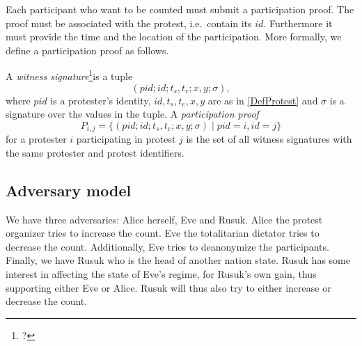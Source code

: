 Each participant who want to be counted must submit a participation proof.
The proof must be associated with the protest, i.e.\ contain its \(id\).
Furthermore it must provide the time and the location of the participation.
More formally, we define a participation proof as follows.

\begin{definition}
  A \emph{witness signature}\footnote{%
    ?
  }is a tuple \[(pid; id; t_s, t_e; x, y; \sigma),\] where
  \(pid\) is a protester's identity,
  \(id, t_s, t_e, x, y\) are as in \cref{DefProtest} and
  \(\sigma\) is a signature over the values in the tuple.
  A \emph{participation proof} \[P_{i, j} = \{ (pid; id; t_s, t_e; x, y; \sigma) 
    \mid pid = i, id = j\}\] for a protester \(i\) participating in protest 
  \(j\) is the set of all witness signatures with the same protester and protest 
  identifiers.
\end{definition}


\subsection{Adversary model}

We have three adversaries: Alice herself, Eve and Rusuk.
Alice the protest organizer tries to increase the count.
Eve the totalitarian dictator tries to decrease the count.
Additionally, Eve tries to deanonymize the participants.
Finally, we have Rusuk who is the head of another nation state.
Rusuk has some interest in affecting the state of Eve's regime, for Rusuk's own 
gain, thus supporting either Eve or Alice.
Rusuk will thus also try to either increase or decrease the count.

